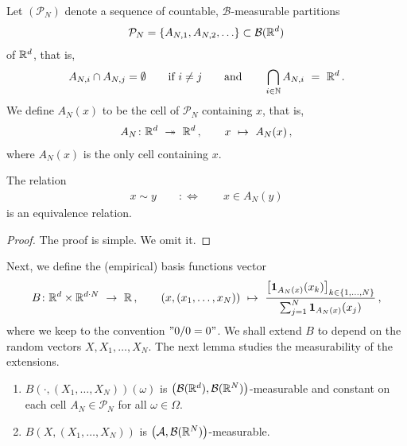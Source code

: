 Let $
\left(
\mathcal{P}_N
\right)
$
denote a sequence of countable, $\mathcal{B}$-measurable partitions 
\begin{align*}
\mathcal{P}_N= \left\{
  A_{N,1},
  A_{N,2},
  \ldots
\right\}
\subset \mathcal{B}(\mathbb{R}^d)
\end{align*}
of $\mathbb{R}^d$, that is, 
\begin{align*}
  A_{N,i}\cap A_{N,j}=\emptyset
  \qquad
  \text{if}\ i\neq j
  \qquad
  \text{and}
  \qquad 
  \bigcap_{i\in\mathbb{N}}A_{N,i}
  \ 
  =
  \ 
  \R^d
  \,.
\end{align*}
We define
$ A_N(x) $ to be the cell of $ \mathcal{P}_N $ containing $x$, that is,
\begin{align*}
  A_N
  \colon
  \R^d 
  \ 
  \twoheadrightarrow 
  \ 
  \R^d  
  \,,\qquad
  x
  \ 
  \mapsto
  \ 
  A_N(x)
  \,,
\end{align*}
where $A_N(x)$ is the only cell containing $x$. 

\begin{lemma}
  \label{lem:basis_equiv_r}
  The relation
  \begin{align*}
    x\sim y
    \qquad
    :\Leftrightarrow
    \qquad
    x\in A_N(y)
  \end{align*}
  is an equivalence relation.
\end{lemma}
\begin{proof}
  The proof is simple. We omit it.
\end{proof}
Next, we define the (empirical) basis functions vector
\begin{align}
  \label{def:basis}
  B\colon
  \R^d\times \R^{d\cdot N}
  \ 
  \to
  \ 
  \R
  \,,
  \qquad
  (x,(x_1,\ldots,x_N))
  \ 
  \mapsto
  \ 
  \frac
  {
    \left[
    \mathbf{1}
    _{
      A_N(x)
    }
    (x_k)
    \right]
    _{k\in \left\{
        1,\ldots,N
    \right\}}
  }
  {
    \sum_{j=1}^N
    \mathbf{1}
    _{
      A_N(x)
    }
    (x_j)
    }
  \,,
\end{align}
where we keep to the convention $"0/0=0"$.
We shall extend $B$ to depend on the random vectors
$X,X_1,\ldots,X_N$.
The next lemma studies the measurability of the extensions.
\begin{lemma}
  \label{lem:basis_meas}
  \quad
  \begin{enumerate}[label=(\roman*)]
\item
  $B(\cdot,(X_1,\ldots,X_N))(\omega)$ is 
  $\left(
    \mathcal{B}(\mathbb{R}^d),\mathcal{B}(\mathbb{R}^N)
  \right)$-measurable
  and
  constant on each cell 
  $A_N\in\mathcal{P}_N$
  for all $\omega\in\Omega$. 
\item
  $B(X,(X_1,\ldots,X_N))$ is $\left(
    \mathcal{A},\mathcal{B}(\mathbb{R}^N)
  \right)$-measurable. 
  \end{enumerate}
\end{lemma}

